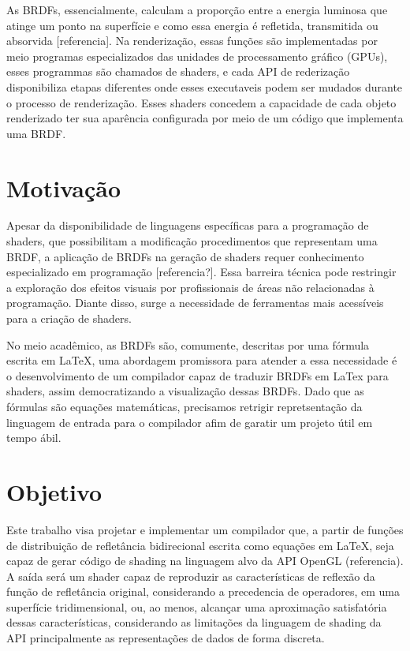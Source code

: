 \documentclass[english, 
               brazil, 
               bsc] %
               {dcomp-abntex2}
\begin{document}
As BRDFs, essencialmente, calculam a proporção entre a energia luminosa que atinge um ponto na superfície e como essa energia é refletida, transmitida ou absorvida [referencia]. Na renderização, essas funções são implementadas por meio programas especializados das unidades de processamento gráfico (GPUs), esses programmas são chamados de shaders, e cada API de rederização disponibiliza etapas diferentes onde esses executaveis podem ser mudados durante o processo de renderização. Esses shaders concedem a capacidade de cada objeto renderizado ter sua aparência configurada por meio de um código que implementa uma BRDF.


\section{Motivação}

Apesar da disponibilidade de linguagens específicas para a programação de shaders, que possibilitam a modificação procedimentos que representam uma BRDF, a aplicação de BRDFs na geração de shaders requer conhecimento especializado em programação [referencia?]. Essa barreira técnica pode restringir a exploração dos efeitos visuais por profissionais de áreas não relacionadas à programação. Diante disso, surge a necessidade de ferramentas mais acessíveis para a criação de shaders.

No meio acadêmico, as BRDFs são, comumente, descritas por uma fórmula escrita em LaTeX, uma abordagem promissora para atender a essa necessidade é o desenvolvimento de um compilador capaz de traduzir BRDFs em LaTex para shaders, assim democratizando a visualização dessas BRDFs. Dado que as fórmulas são equações matemáticas, precisamos retrigir repretsentação da linguagem de entrada para o compilador afim de garatir um projeto útil em tempo ábil.

\section{Objetivo}
Este trabalho visa projetar e implementar um compilador que, a partir de funções de distribuição de refletância bidirecional escrita como equações em LaTeX, seja capaz de gerar código de shading na linguagem alvo da API OpenGL (referencia). A saída será um shader capaz de reproduzir as características de reflexão da função de refletância original, considerando a precedencia de operadores, em uma superfície tridimensional, ou, ao menos, alcançar uma aproximação satisfatória dessas características, considerando as limitações da linguagem de shading da API principalmente as representações de dados de forma discreta.
\end{document}
